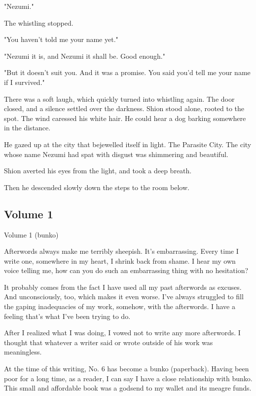 "Nezumi."

The whistling stopped.

"You haven't told me your name yet."

"Nezumi it is, and Nezumi it shall be. Good enough."

"But it doesn't suit you. And it was a promise. You said you'd tell me
your name if I survived."

There was a soft laugh, which quickly turned into whistling again. The
door closed, and a silence settled over the darkness. Shion stood alone,
rooted to the spot. The wind caressed his white hair. He could hear a
dog barking somewhere in the distance.

He gazed up at the city that bejewelled itself in light. The Parasite
City. The city whose name Nezumi had spat with disgust was shimmering
and beautiful.

Shion averted his eyes from the light, and took a deep breath.

Then he descended slowly down the steps to the room below.

\protect\hypertarget{index_split_132.html}{}{}

\hypertarget{index_split_132.htmlux5cux23calibre_pb_136}{%
\subsection{Volume 1}\label{index_split_132.htmlux5cux23calibre_pb_136}}

Volume 1 (bunko)

Afterwords always make me terribly sheepish. It's embarrassing. Every
time I write one, somewhere in my heart, I shrink back from shame. I
hear my own voice telling me, how can you do such an embarrassing thing
with no hesitation?

It probably comes from the fact I have used all my past afterwords as
excuses. And unconsciously, too, which makes it even worse. I've always
struggled to fill the gaping inadequacies of my work, somehow, with the
afterwords. I have a feeling that's what I've been trying to do.

After I realized what I was doing, I vowed not to write any more
afterwords. I thought that whatever a writer said or wrote outside of
his work was meaningless.

At the time of this writing, No. 6 has become a bunko (paperback).
Having been poor for a long time, as a reader, I can say I have a close
relationship with bunko. This small and affordable book was a godsend to
my wallet and its meagre funds.

